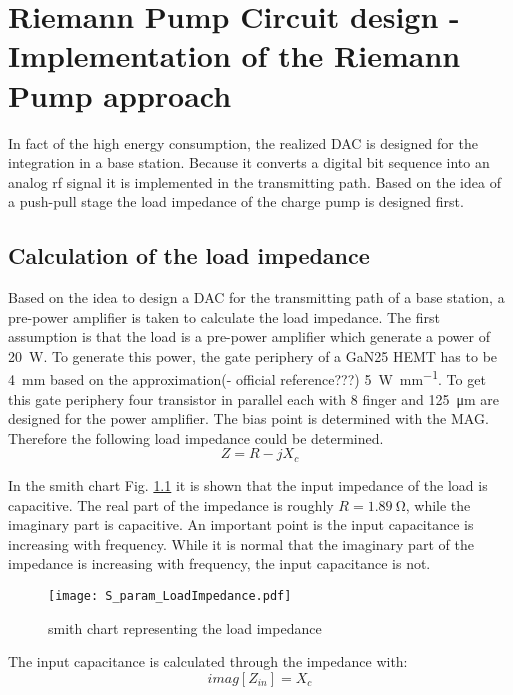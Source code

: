 \chapter{Riemann Pump Circuit design - Implementation of the Riemann Pump approach}
In fact of the high energy consumption, the realized DAC is designed for the integration in a base station. Because it converts a digital bit sequence into an analog rf signal it is implemented in the transmitting path. Based on the idea of a push-pull stage the load impedance of the charge pump is designed first.
\section{Calculation of the load impedance}
Based on the idea to design  a DAC for the transmitting path of a base station, a pre-power amplifier is taken to calculate the load impedance. The first assumption is that the load is a pre-power amplifier which generate a power of \SI{20}{\watt}. To generate this power, the gate periphery of a GaN25 HEMT has to be \SI{4}{\milli \metre} based on the approximation(- official reference???) \SI[per-mode=fraction]{5}{\watt\per\milli\metre}. To get this gate periphery four transistor in parallel each with 8 finger and \SI{125}{\micro \metre} are designed for the power amplifier. The bias point is determined with the MAG. Therefore the following load impedance could be determined.
\begin{equation}
Z = R - jX_c
\end{equation}

In the smith chart Fig. \ref{fig:smith_load_impedance} it is shown that the input impedance of the load is capacitive. The real part of the impedance is roughly $R = \SI{1.89}{\ohm}$, while the imaginary part is capacitive. An important point is the input capacitance is increasing with frequency. While it is normal that the imaginary part of the impedance is increasing with frequency, the input capacitance is not.

 \begin{figure}[ht]
	\centering
  \texttt{[image: S\_param\_LoadImpedance.pdf]}
	\caption{smith chart representing the load impedance}
	\label{fig:smith_load_impedance}
\end{figure}

The input capacitance is calculated through the impedance with:
\begin{equation}
imag[Z_{in}] = X_c
\end{equation}

